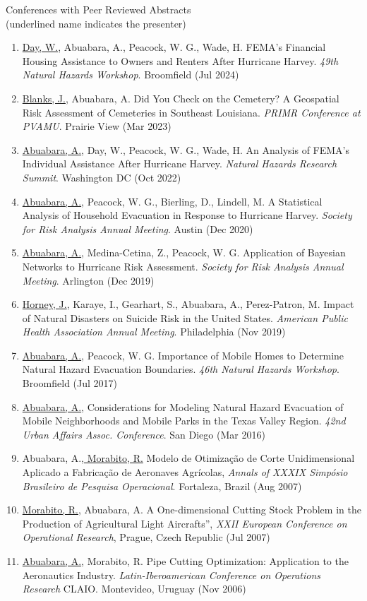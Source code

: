 \documentclass[11pt,oneside]{article}
\begin{document}
{Conferences with Peer Reviewed Abstracts}\\{\small (underlined name indicates the presenter)}
\begin{enumerate}[leftmargin=20pt]
\item \underline{Day, W.}, Abuabara, A., Peacock, W. G., Wade, H. FEMA's Financial Housing Assistance to Owners and Renters After Hurricane Harvey. \emph{49th Natural Hazards Workshop}. Broomfield (Jul 2024)
\item \underline{Blanks, J.}, Abuabara, A. Did You Check on the Cemetery? A Geospatial Risk Assessment of Cemeteries in Southeast Louisiana. \emph{PRIMR Conference at PVAMU}. Prairie View (Mar 2023)
\item \underline{Abuabara, A.}, Day, W., Peacock, W. G., Wade, H. An Analysis of FEMA's Individual Assistance After Hurricane Harvey. \emph{Natural Hazards Research Summit}. Washington DC (Oct 2022)
\item \underline{Abuabara, A.}, Peacock, W. G., Bierling, D., Lindell, M. A Statistical Analysis of Household Evacuation in Response to Hurricane Harvey. \emph{Society for Risk Analysis Annual Meeting}. Austin (Dec 2020)
\item \underline{Abuabara, A.}, Medina-Cetina, Z., Peacock, W. G. Application of Bayesian Networks to Hurricane Risk Assessment. \emph{Society for Risk Analysis Annual Meeting}. Arlington (Dec 2019)
\item \underline{Horney, J.}, Karaye, I., Gearhart, S., Abuabara, A., Perez-Patron, M. Impact of Natural Disasters on Suicide Risk in the United States. \emph{American Public Health Association Annual Meeting}. Philadelphia (Nov 2019)
\item \underline{Abuabara, A.}, Peacock, W. G. Importance of Mobile Homes to Determine Natural Hazard Evacuation Boundaries. \emph{46th Natural Hazards Workshop}. Broomfield (Jul 2017)
\item \underline{Abuabara, A.}, Considerations for Modeling Natural Hazard Evacuation of Mobile Neighborhoods and Mobile Parks in the Texas Valley Region. \emph{42nd Urban Affairs Assoc. Conference}. San Diego (Mar 2016)
\item Abuabara, A.,\underline{ Morabito, R.} Modelo de Otimização de Corte Unidimensional Aplicado a Fabricação de Aeronaves Agrícolas, \emph{Annals of XXXIX Simpósio Brasileiro de Pesquisa Operacional}. Fortaleza, Brazil (Aug 2007)
\item \underline{Morabito, R.}, Abuabara, A. A One-dimensional Cutting Stock Problem in the Production of Agricultural Light Aircrafts”, \emph{XXII European Conference on Operational Research}, Prague, Czech Republic (Jul 2007)
\item \underline{Abuabara, A.}, Morabito, R. Pipe Cutting Optimization: Application to the Aeronautics Industry. \emph{Latin-Iberoamerican Conference on Operations Research} CLAIO. Montevideo, Uruguay (Nov 2006)
\end{enumerate}
\end{document}
